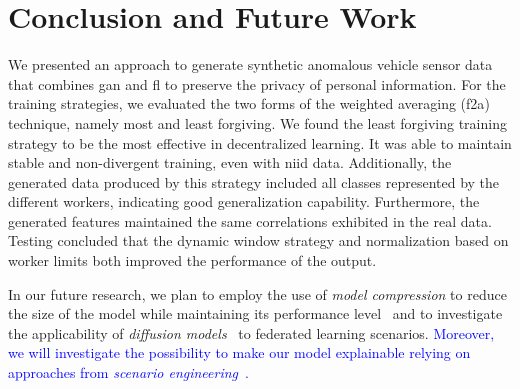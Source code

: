\section{Conclusion and Future Work}


We presented an approach to generate synthetic anomalous vehicle sensor data that combines \gls*{gan} and \gls*{fl} to preserve the privacy of personal information. For the training strategies, %
%
we evaluated the two forms of the weighted averaging (\gls*{f2a}) technique, namely most and least forgiving. %
%
We found the least forgiving training strategy to be the most effective in decentralized learning. It was able to maintain stable and non-divergent training, even with \gls*{niid} data. Additionally, the generated data produced by this strategy included all classes represented by the different workers, indicating good generalization capability. Furthermore, the generated features maintained the same correlations exhibited in the real data.
%
Testing concluded that the dynamic window strategy and normalization based on worker limits both improved the performance of the output. 


In our future research, we plan to employ the use of \textit{model compression} to reduce the size of the model while maintaining its performance level~\cite{hinton2015distilling} and to investigate the applicability of \textit{diffusion models}~\cite{alcaraz_diffusion-based_2022} to federated learning scenarios.  \textcolor{blue}{
 Moreover, we will investigate the possibility to make our model explainable relying on approaches from \textit{scenario engineering}~\cite{Li2022Features, Li2023Novel}.}


